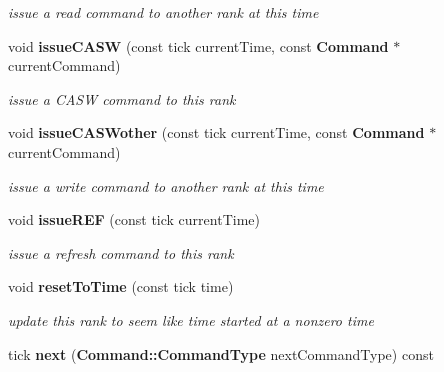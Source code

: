 \begin{CompactItemize}
\begin{CompactList}\small\item\em issue a read command to another rank at this time \item\end{CompactList}\item 
void {\bf issueCASW} (const tick currentTime, const {\bf Command} $\ast$currentCommand)\label{class_d_r_a_msim_i_i_1_1_rank_c996e22365a6a5b5725a270477c50377}

\begin{CompactList}\small\item\em issue a CASW command to this rank \item\end{CompactList}\item 
void {\bf issueCASWother} (const tick currentTime, const {\bf Command} $\ast$currentCommand)\label{class_d_r_a_msim_i_i_1_1_rank_89bd002a9f75ea2638acb9ced38a4249}

\begin{CompactList}\small\item\em issue a write command to another rank at this time \item\end{CompactList}\item 
void {\bf issueREF} (const tick currentTime)\label{class_d_r_a_msim_i_i_1_1_rank_60bd1d77cbcdb576c9069f8a85355bfd}

\begin{CompactList}\small\item\em issue a refresh command to this rank \item\end{CompactList}\item 
void {\bf resetToTime} (const tick time)
\begin{CompactList}\small\item\em update this rank to seem like time started at a nonzero time \item\end{CompactList}\item 
tick {\bf next} ({\bf Command::CommandType} nextCommandType) const \label{class_d_r_a_msim_i_i_1_1_rank_6b32d7bde7506fce22151d4d9fbfc404}


\end{CompactItemize}
